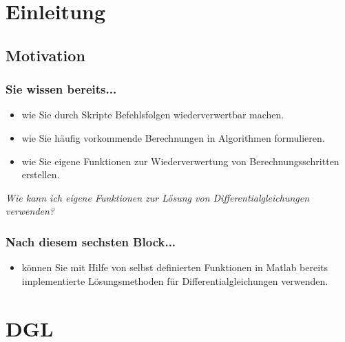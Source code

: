 


\usepackage{amsmath}
\usepackage{mathtools}
\setcounter{mchapter}{6}
\setcounter{mexercise}{0}


  

  \section{Einleitung}

  \subsection{Motivation}
  \begin{frame}
      \frametitle{Sie wissen bereits...}
      \begin{itemize}
          \item wie Sie durch Skripte Befehlsfolgen wiederverwertbar machen.
          \item wie Sie häufig vorkommende Berechnungen in Algorithmen formulieren.
          \item wie Sie eigene Funktionen zur Wiederverwertung von Berechnungsschritten erstellen.
      \end{itemize}

      \textit{Wie kann ich eigene Funktionen zur Lösung von Differentialgleichungen verwenden?}
  \end{frame}

  \begin{frame}
      \frametitle{Nach diesem sechsten Block...}
      \begin{itemize}
          \item können Sie mit Hilfe von selbst definierten Funktionen in Matlab bereits implementierte Lösungsmethoden für Differentialgleichungen verwenden.
       \end{itemize}
  \end{frame}


  \section{DGL}

